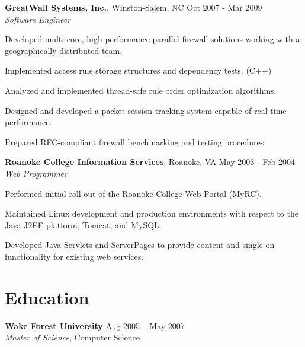 \documentclass[margin,line]{resume}
\begin{document}
\begin{resume}
  \textbf{GreatWall Systems, Inc.}, Winston-Salem, NC \hfill Oct 2007 - Mar 2009\vspace{1mm}\\
  \textsl{Software Engineer}\\
  \vspace{-3mm}
  \begin{list2}
\item Developed multi-core, high-performance parallel firewall solutions working
  with a geographically distributed team.
\item Implemented access rule storage structures and dependency tests. (C++)
\item Analyzed and implemented thread-safe rule order optimization algorithms.
\item Designed and developed a packet session tracking system capable of real-time
  performance.
\item Prepared RFC-compliant firewall benchmarking and testing procedures.
  \end{list2}

  \textbf{Roanoke College Information Services}, Roanoke, VA \hfill May 2003 - Feb 2004\vspace{1mm}\\
  \textsl{Web Programmer}\\
  \vspace{-3mm}
  \begin{list2}
\item Performed initial roll-out of the Roanoke College Web Portal (MyRC).
\item Maintained Linux development and production environments with respect to
  the Java J2EE platform, Tomcat, and MySQL.
\item Developed Java Servlets and ServerPages to provide content and single-on
  functionality for existing web services.
  \end{list2}



  \section{\mysidestyle \textcolor{mySideColor}{Education}}

  \textbf{Wake Forest University}\vspace{2mm} \hfill Aug 2005 -- May 2007\\
  \textsl{Master of Science}, Computer Science\vspace{-1mm}


\end{resume}
\end{document}
